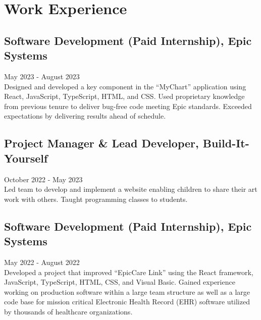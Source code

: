 \documentclass[a4paper,10pt]{article}
\begin{document}

\section*{Work Experience}
\subsection*{Software Development (Paid Internship), Epic Systems} May 2023 - August 2023 \\
Designed and developed a key component in the “MyChart” application using React, JavaScript, TypeScript, HTML, and CSS. Used proprietary knowledge from previous tenure to deliver bug-free code meeting Epic standards. Exceeded expectations by delivering results ahead of schedule.

\subsection*{Project Manager \& Lead Developer, Build-It-Yourself} October 2022 - May 2023 \\
Led team to develop and implement a website enabling children to share their art work with others. Taught programming classes to students.  

\subsection*{Software Development (Paid Internship), Epic Systems}
May 2022 - August 2022 \\
Developed a project that improved “EpicCare Link” using the React framework, JavaScript, TypeScript, HTML, CSS, and Visual Basic. Gained experience working on production software within a large team structure as well as a large code base for mission critical Electronic Health Record (EHR) software utilized by thousands of healthcare organizations.
\end{document}
